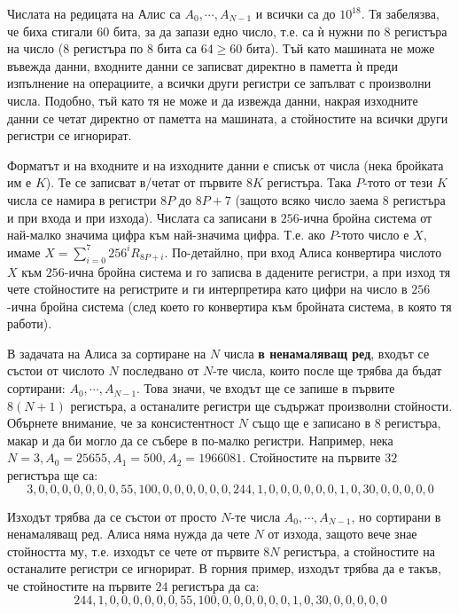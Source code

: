 \documentclass[12pt]{article}
\begin{document}
Числата на редицата на Алис са $A_0, \cdots, A_{N-1}$ и всички са до $10^{18}$. Тя забелязва, че биха стигали $60$ бита, за да запази едно число, т.е. са ѝ нужни по 8 регистъра на число ($8$ регистъра по $8$ бита са $64 \geq 60$ бита). Тъй като машината не може въвежда данни, входните данни се записват директно в паметта ѝ преди изпълнение на операциите,
а всички други регистри се запълват с произволни числа.
Подобно, тъй като тя не може и да извежда данни, накрая изходните данни се четат директно от паметта на машината,
а стойностите на всички други регистри се игнорират.

Форматът и на входните и на изходните данни е списък от числа (нека бройката им е $K$). Те се записват в/четат от първите $8K$ регистъра. Така $P$-тото от тези $K$ числа се намира в регистри $8P$ до $8P+7$ (защото всяко число заема $8$ регистъра и при входа и при изхода).
Числата са записани в $256$-ична бройна система от най-малко значима цифра към най-значима цифра.
Т.е. ако $P$-тото число е $X$, имаме $X = \sum_{i = 0}^{7} 256^i R_{8P + i}$. По-детайлно, при вход Алиса конвертира числото $X$ към $256$-ична бройна система и го записва в дадените регистри, а при изход тя чете стойностите на регистрите и ги интерпретира като цифри на число в $256$-ична бройна система (след което го конвертира към бройната система, в която тя работи).

В задачата на Алиса за сортиране на $N$ числа \textbf{в ненамаляващ ред}, входът се състои от числото $N$ последвано от $N$-те числа, които после ще трябва да бъдат сортирани: $A_0, \cdots, A_{N-1}$. Това значи, че входът ще се запише в първите $8 (N + 1)$ регистъра, а останалите регистри ще съдържат произволни стойности. Обърнете внимание, че за консистентност $N$ също ще е записано в $8$ регистъра, макар и да би могло да се събере в по-малко регистри. Например, нека $N = 3, A_0 = 25655, A_1 = 500, A_2 = 1966081$. Стойностите на първите $32$ регистъра ще са:
\begingroup
\setlength\abovedisplayskip{4pt}
\setlength\belowdisplayskip{0pt}
\begin{equation*}
3, 0, 0, 0, 0, 0, 0, 0, 55, 100, 0, 0, 0, 0, 0, 0, 244, 1, 0, 0, 0, 0, 0, 0, 1, 0, 30, 0, 0, 0, 0, 0
\end{equation*}

Изходът трябва да се състои от просто $N$-те числа $A_0, \cdots, A_{N-1}$, но сортирани в ненамаляващ ред. Алиса няма нужда да чете $N$ от изхода, защото вече знае стойността му, т.е. изходът се чете от първите $8N$ регистъра, а стойностите на останалите регистри се игнорират.
В горния пример, изходът трябва да е такъв, че стойностите на първите $24$ регистъра да са:
\begingroup
\setlength\abovedisplayskip{4pt}
\setlength\belowdisplayskip{0pt}
\begin{equation*}
244, 1, 0, 0, 0, 0, 0, 0, 55, 100, 0, 0, 0, 0, 0, 0, 1, 0, 30, 0, 0, 0, 0, 0
\end{equation*}
\end{document}
